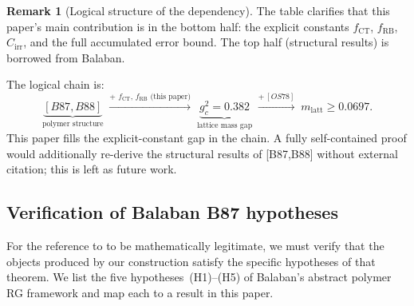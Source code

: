 \documentclass[11pt,a4paper]{amsart}
\theoremstyle{definition}
\newtheorem{remark}[theorem]{Remark}
\newcommand{\CT}{\mathrm{CT}}
\begin{document}
\begin{remark}[Logical structure of the dependency]
\label{rem:logical_dependency}
The table clarifies that this paper's main contribution is in the bottom half:
the explicit constants $f_{\CT}$, $f_{\mathrm{RB}}$, $C_{\mathrm{irr}}$,
and the full accumulated error bound.  The top half (structural results) is
borrowed from Balaban.

The logical chain is:
\[
  \underbrace{[B87,B88]}_{\text{polymer structure}}
  \;\xrightarrow{\text{+ }f_{\CT},\,f_{\mathrm{RB}}\text{ (this paper)}}\;
  \underbrace{g^2_c = 0.382}_{\text{lattice mass gap}}
  \;\xrightarrow{\text{+}\,[OS78]}\;
  m_{\mathrm{latt}} \ge 0.0697.
\]
This paper fills the explicit-constant gap in the chain.  A fully self-contained
proof would additionally re-derive the structural results of [B87,B88] without
external citation; this is left as future work.
\end{remark}

\subsection{Verification of Balaban B87 hypotheses}
\label{sec:balaban_hypotheses}

For the reference to \cite[Thm.~2.1]{B87} to be mathematically legitimate, we must
verify that the objects produced by our construction satisfy the specific hypotheses
of that theorem.  We list the five hypotheses~(H1)--(H5) of Balaban's
abstract polymer RG framework and map each to a result in this paper.
\end{document}
